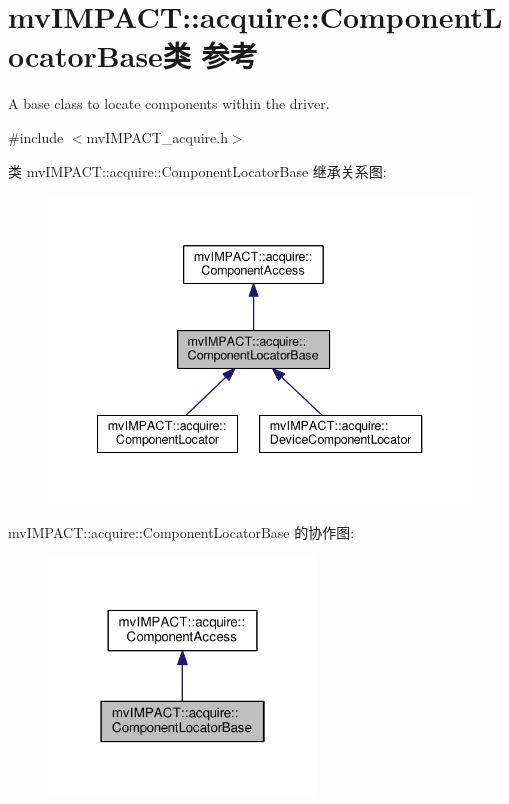 \hypertarget{classmv_i_m_p_a_c_t_1_1acquire_1_1_component_locator_base}{\section{mv\+I\+M\+P\+A\+C\+T\+:\+:acquire\+:\+:Component\+Locator\+Base类 参考}
\label{classmv_i_m_p_a_c_t_1_1acquire_1_1_component_locator_base}
}


A base class to locate components within the driver.  




{\ttfamily \#include $<$mv\+I\+M\+P\+A\+C\+T\+\_\+acquire.\+h$>$}



类 mv\+I\+M\+P\+A\+C\+T\+:\+:acquire\+:\+:Component\+Locator\+Base 继承关系图\+:
\nopagebreak
\begin{figure}[H]
\begin{center}
\leavevmode
\includegraphics[width=340pt]{classmv_i_m_p_a_c_t_1_1acquire_1_1_component_locator_base__inherit__graph}
\end{center}
\end{figure}


mv\+I\+M\+P\+A\+C\+T\+:\+:acquire\+:\+:Component\+Locator\+Base 的协作图\+:
\nopagebreak
\begin{figure}[H]
\begin{center}
\leavevmode
\includegraphics[width=202pt]{classmv_i_m_p_a_c_t_1_1acquire_1_1_component_locator_base__coll__graph}
\end{center}
\end{figure}
